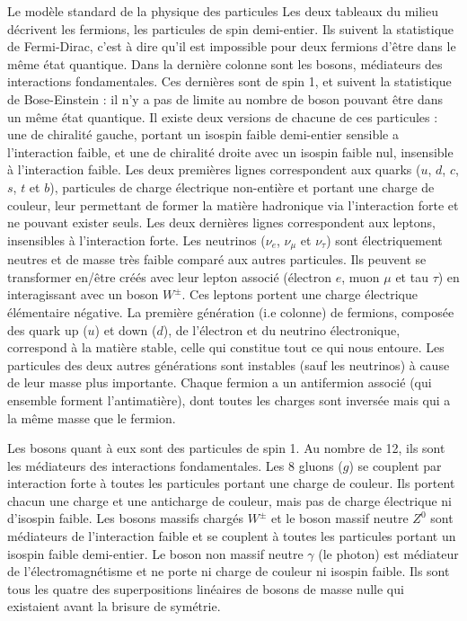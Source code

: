 \begin{figure*}[!htb!]
\begin{activitybox}[label=box::SM]{Le modèle standard de la physique des particules}
          Les deux tableaux du milieu décrivent les fermions, les particules de spin demi-entier. Ils suivent la statistique de Fermi-Dirac, c'est à dire qu'il est impossible pour deux fermions d'être dans le même état quantique. Dans la dernière colonne sont les bosons, médiateurs des interactions fondamentales. Ces dernières sont de spin 1, et suivent la statistique de Bose-Einstein : il n'y a pas de limite au nombre de boson pouvant être dans un même état quantique. Il existe deux versions de chacune de ces particules : une de chiralité gauche, portant un isospin faible demi-entier sensible a l'interaction faible, et une de chiralité droite avec un isospin faible nul, insensible à l'interaction faible. Les deux premières lignes correspondent aux quarks ($u$, $d$, $c$, $s$, $t$ et $b$), particules de charge électrique non-entière et portant une charge de couleur, leur permettant de former la matière hadronique via l'interaction forte et ne pouvant exister seuls. Les deux dernières lignes correspondent aux leptons, insensibles à l'interaction forte. Les neutrinos  ($\nu_e$, $\nu_{\mu}$ et $\nu_{\tau}$) sont électriquement neutres et de masse très faible comparé aux autres particules. Ils peuvent se transformer en/être créés avec leur lepton associé (électron $e$, muon $\mu$ et tau $\tau$) en interagissant avec un boson $W^{\pm}$. Ces leptons portent une charge électrique élémentaire négative. La première génération (i.e colonne) de fermions, composée des quark up ($u$) et down ($d$), de l'électron et du neutrino électronique, correspond à la matière stable, celle qui constitue tout ce qui nous entoure. Les particules des deux autres générations sont instables (sauf les neutrinos) à cause de leur masse plus importante. Chaque fermion a un antifermion associé (qui ensemble forment l'antimatière), dont toutes les charges sont inversée mais qui a la même masse que le fermion.
        
          Les bosons quant à eux sont des particules de spin 1. Au nombre de 12, ils sont les médiateurs des interactions fondamentales. Les 8 gluons ($g$) se couplent par interaction forte à toutes les particules portant une charge de couleur. Ils portent chacun une charge et une anticharge de couleur, mais pas de charge électrique ni d'isospin faible. Les bosons massifs chargés $W^{\pm}$ et le boson massif neutre $Z^0$ sont médiateurs de l'interaction faible et se couplent à toutes les particules portant un isospin faible demi-entier. Le boson non massif neutre $\gamma$ (le photon) est médiateur de l'électromagnétisme et ne porte ni charge de couleur ni isospin faible. Ils sont tous les quatre des superpositions linéaires de bosons de masse nulle qui existaient avant la brisure de symétrie.
        \end{activitybox}
      \end{figure*}

